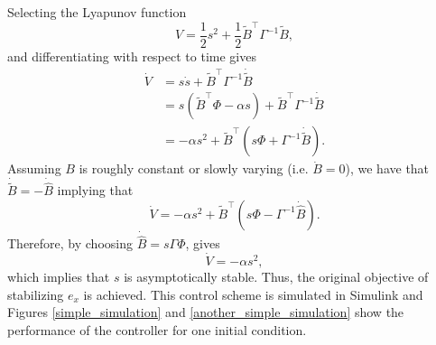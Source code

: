 Selecting the Lyapunov function
\begin{equation}
V=\frac{1}{2}s^2+\frac{1}{2}\tilde{B}^\top \Gamma^{-1}\tilde{B},
\label{v}
\end{equation}
and differentiating with respect to time gives
\begin{align}
\dot{V}&=s\dot{s}+\tilde{B}^\top \Gamma^{-1}\dot{\tilde{B}}
\\&=s(\tilde{B}^\top\Phi-\alpha s)+\tilde{B}^\top \Gamma^{-1}\dot{\tilde{B}}
\\&=-\alpha s^2+\tilde{B}^\top(s\Phi+\Gamma^{-1}\dot{\tilde{B}}).
\label{vdot}
\end{align}
Assuming $B$ is roughly constant or slowly varying (i.e. $\dot{B}=0$), we have that $\dot{\tilde{B}}=-\dot{\hat{B}}$ implying that
\begin{equation}
\dot{V}=-\alpha s^2+\tilde{B}^\top(s\Phi-\Gamma^{-1}\dot{\hat{B}}).
\end{equation}
Therefore, by choosing $\dot{\hat{B}}=s\Gamma\Phi$, gives
\begin{equation}
\dot{V}=-\alpha s^2,
\end{equation}
which implies that $s$ is asymptotically stable. Thus, the original objective of stabilizing $e_x$ is achieved. This control scheme is simulated in Simulink and Figures \ref{simple_simulation} and \ref{another_simple_simulation} show the performance of the controller for one initial condition. 
